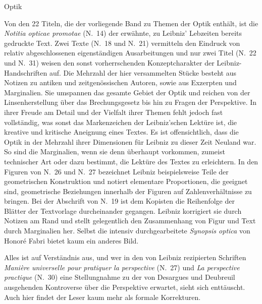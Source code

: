 Optik\par\vspace{1.0ex}

Von den 22 Titeln, die der vorliegende Band zu Themen der Optik enth\"{a}lt, ist die \textit{Notitia opticae promotae} (N.~14) der erw\"{a}hnte, zu Leibniz' Lebzeiten bereits gedruckte Text. Zwei Texte (N.~18 und N.~21) vermitteln den \mbox{Eindruck} von relativ abgeschlossenen eigenst\"{a}ndigen Ausarbeitungen und nur zwei Titel (N.~22 und N.~31) weisen den sonst vorherrschenden Konzeptcharakter der Leibniz-Handschriften auf. Die Mehrzahl der hier versammelten St\"{u}cke besteht aus Notizen zu antiken und zeitgen\"{o}ssischen Autoren, sowie aus Exzerpten und Marginalien. Sie umspannen das gesamte Gebiet der Optik und reichen von der Linsenherstellung \"{u}ber das Brechungsgesetz bis hin zu Fragen der Perspektive. In ihrer Freude am Detail und der Vielfalt ihrer Themen fehlt jedoch fast vollst\"{a}ndig, was sonst das Markenzeichen der Leibniz'schen Lekt\"{u}re ist, die kreative und kritische Aneignung eines Textes. Es ist offensichtlich, dass die Optik in der Mehrzahl ihrer Dimensionen f\"{u}r Leibniz zu dieser Zeit Neuland war. So sind die Marginalien, wenn sie denn \"{u}berhaupt vorkommen, zumeist technischer Art oder dazu bestimmt, die Lekt\"{u}re des Textes zu erleichtern. In den Figuren von N.~26 und N.~27 bezeichnet Leibniz beispielsweise Teile der geometrischen Konstruktion und notiert elementare Proportionen, die geeignet sind, geometrische Beziehungen innerhalb der Figuren auf Zahlenverh\"{a}ltnisse zu bringen. Bei der Abschrift von N.~19 ist dem Kopisten die Reihenfolge der Bl\"{a}tter der Textvorlage durcheinander gegangen. Leibniz korrigiert sie durch Notizen am Rand und stellt gelegentlich den Zusammenhang von Figur und Text durch Marginalien her. Selbst die intensiv durchgearbeitete \textit{Synopsis optica} von Honor\'{e} Fabri bietet kaum ein anderes Bild.\par
Alles ist auf Verst\"{a}ndnis aus, und wer in den von Leibniz rezipierten Schriften \textit{Mani\`{e}re universelle pour pratiquer la perspective} (N.~27) und \textit{La perspective practique} (N.~30) eine Stellungnahme zu der von Desargues und Deubreuil ausgehenden Kontroverse \"{u}ber die Perspektive erwartet, sieht sich entt\"{a}uscht. Auch hier findet der Leser kaum mehr als formale Korrekturen.\par

